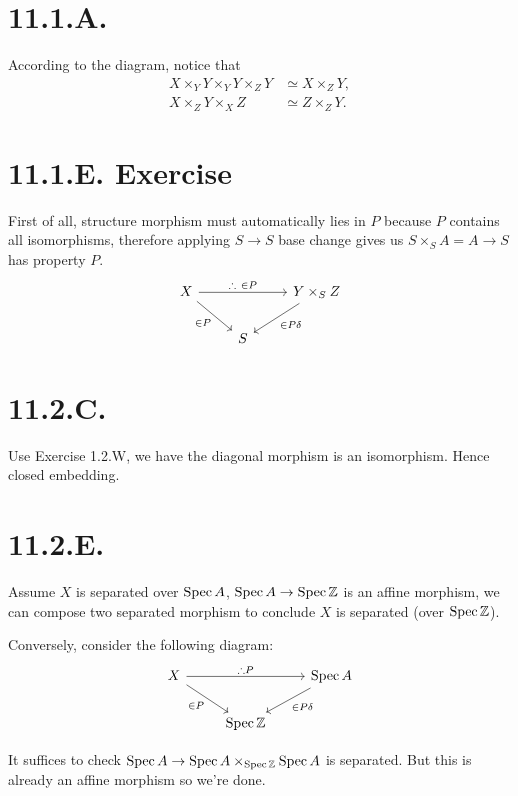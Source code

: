 \section{11.1.A.}

According to the diagram, notice that 
\begin{align*}
    X\times_Y Y \times_Y Y\times_Z Y &\simeq X\times_Z Y,\\
    X\times_Z Y \times_X Z &\simeq Z\times_Z Y.
\end{align*}

\section{11.1.E. Exercise}

First of all, structure morphism must automatically lies in $P$ because $P$ contains all isomorphisms, therefore applying $S\to S$ base change gives us $S\times_S A=A\to S$ has property $P$. 
\[%
\begin{tikzcd}
X \arrow[rd, "\in P"'] \arrow[rr, "\therefore ~\in P"] &   & Y\times_S Z \arrow[ld, "\in P\delta"] \\
                                                       & S &                                      
\end{tikzcd}\] 

\section{11.2.C.}

Use Exercise 1.2.W, we have the diagonal morphism is an isomorphism. Hence closed embedding.

\section{11.2.E.}

Assume $X$ is separated over $\operatorname{Spec} A$, $\operatorname{Spec} A\to \operatorname{Spec} \mathbb Z$ is an affine morphism, we can compose two separated morphism to conclude $X$ is separated (over $\operatorname{Spec} \mathbb Z$). 

Conversely, consider the following diagram: 
\[%
\begin{tikzcd}
X \arrow[rr, "\therefore P"] \arrow[rd, "\in P"'] &                              & \operatorname{Spec}A \arrow[ld, "\in P\delta"] \\
                                                  & \operatorname{Spec}\mathbb Z &                                               
\end{tikzcd}\]

It suffices to check $\operatorname{Spec} A\to \operatorname{Spec} A\times_{\operatorname{Spec} \mathbb Z} \operatorname{Spec} A$ is separated. But this is already an affine morphism so we're done.